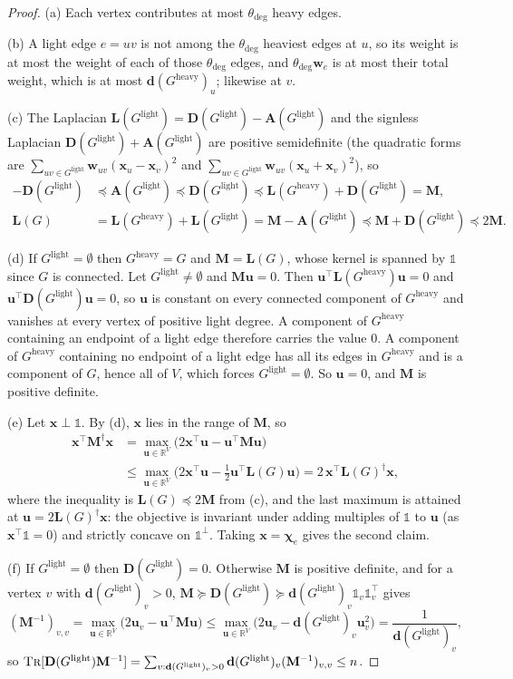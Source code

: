 \documentclass[11pt]{article}
\theoremstyle{remark}
\renewcommand{\AA}{\mathbf A}
\newcommand{\cchi}{{\boldsymbol\chi}}
\newcommand{\dd}{\mathbf d}
\newcommand{\DD}{\mathbf D}
\newcommand{\LL}{\mathbf L}
\newcommand{\MM}{\mathbf M}
\newcommand{\uu}{\mathbf u}
\newcommand{\ww}{\mathbf w}
\newcommand{\xx}{\mathbf x}
\newcommand{\dheavy}{\theta_{\deg}}
\newcommand{\Gh}{G^{\mathrm{heavy}}}
\newcommand{\Gl}{G^{\mathrm{light}}}
\newcommand{\R}{\mathbb R}
\newcommand{\oone}{\mathds{1}}
\newcommand{\tr}{\textsc{Tr}}
\begin{document}
\begin{proof}
(a) Each vertex contributes at most $\dheavy$ heavy edges.

(b) A light edge $e=uv$ is not among the $\dheavy$ heaviest edges at $u$,
so its weight is at most the weight of each of those $\dheavy$ edges, and
$\dheavy\ww_e$ is at most their total weight, which is at most $\dd(\Gh)_u$;
likewise at $v$.

(c) The Laplacian $\LL(\Gl)=\DD(\Gl)-\AA(\Gl)$ and the signless Laplacian
$\DD(\Gl)+\AA(\Gl)$ are positive semidefinite (the quadratic forms are
$\sum_{uv\in\Gl}\ww_{uv}(\xx_u-\xx_v)^{2}$ and
$\sum_{uv\in\Gl}\ww_{uv}(\xx_u+\xx_v)^{2}$), so
\begin{align*}
-\DD(\Gl)&\preceq\AA(\Gl)\preceq\DD(\Gl)\preceq\LL(\Gh)+\DD(\Gl)=\MM,\\
\LL(G)&=\LL(\Gh)+\LL(\Gl)=\MM-\AA(\Gl)\preceq\MM+\DD(\Gl)\preceq2\MM .
\end{align*}

(d) If $\Gl=\emptyset$ then $\Gh=G$ and $\MM=\LL(G)$, whose kernel is
spanned by $\oone$ since $G$ is connected.
Let $\Gl\neq\emptyset$ and $\MM\uu=0$.
Then $\uu^{\top}\LL(\Gh)\uu=0$ and $\uu^{\top}\DD(\Gl)\uu=0$, so $\uu$ is
constant on every connected component of $\Gh$ and vanishes at every vertex
of positive light degree.
A component of $\Gh$ containing an endpoint of a light edge therefore
carries the value $0$.
A component of $\Gh$ containing no endpoint of a light edge has all its
edges in $\Gh$ and is a component of $G$, hence all of $V$, which forces
$\Gl=\emptyset$.
So $\uu=0$, and $\MM$ is positive definite.

(e) Let $\xx\perp\oone$.
By (d), $\xx$ lies in the range of $\MM$, so
\begin{align*}
\xx^{\top}\MM^{\dag}\xx
&=\max_{\uu\in\R^{V}}\bigl(2\xx^{\top}\uu-\uu^{\top}\MM\uu\bigr)\\
&\le\max_{\uu\in\R^{V}}\bigl(2\xx^{\top}\uu-\tfrac12\uu^{\top}\LL(G)\uu\bigr)
=2\,\xx^{\top}\LL(G)^{\dag}\xx ,
\end{align*}
where the inequality is $\LL(G)\preceq2\MM$ from (c), and the last maximum
is attained at $\uu=2\LL(G)^{\dag}\xx$: the objective is invariant under
adding multiples of $\oone$ to $\uu$ (as $\xx^{\top}\oone=0$) and strictly
concave on $\oone^{\perp}$.
Taking $\xx=\cchi_e$ gives the second claim.

(f) If $\Gl=\emptyset$ then $\DD(\Gl)=0$.
Otherwise $\MM$ is positive definite, and for a vertex $v$ with
$\dd(\Gl)_v>0$, $\MM\succeq\DD(\Gl)\succeq\dd(\Gl)_v\oone_v\oone_v^{\top}$ gives
\[
(\MM^{-1})_{v,v}
=\max_{\uu\in\R^{V}}\bigl(2\uu_v-\uu^{\top}\MM\uu\bigr)
\le\max_{\uu\in\R^{V}}\bigl(2\uu_v-\dd(\Gl)_v\uu_v^{2}\bigr)
=\frac1{\dd(\Gl)_v},
\]
so $\tr[\DD(\Gl)\MM^{-1}]=\sum_{v:\dd(\Gl)_v>0}\dd(\Gl)_v(\MM^{-1})_{v,v}\le n$.


\end{proof}
\end{document}
